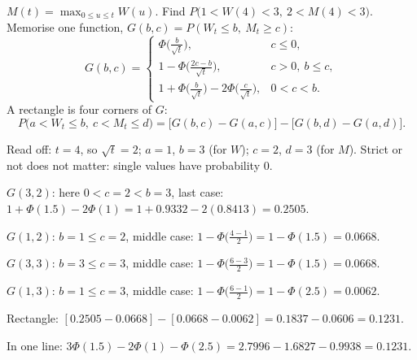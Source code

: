 \begin{problem}[Q5(b)]
$M(t)=\max_{0\le u\le t}W(u)$. Find $P\big(1<W(4)<3,\ 2<M(4)<3\big)$.
\cardsays Memorise one function, $G(b,c)=P(W_t\le b,\ M_t\ge c)$:
\[
G(b,c)=\begin{cases}\Phi\big(\frac{b}{\sqrt t}\big),&c\le0,\\[0.5ex] 1-\Phi\big(\frac{2c-b}{\sqrt t}\big),&c>0,\ b\le c,\\[0.5ex] 1+\Phi\big(\frac b{\sqrt t}\big)-2\Phi\big(\frac c{\sqrt t}\big),&0<c<b.\end{cases}
\]
A rectangle is four corners of $G$:
\[
P\big(a<W_t\le b,\ c<M_t\le d\big)=\big[G(b,c)-G(a,c)\big]-\big[G(b,d)-G(a,d)\big].
\]
\working
\begin{steps}
\item Read off: $t=4$, so $\sqrt t=2$; $a=1$, $b=3$ (for $W$); $c=2$, $d=3$ (for $M$). Strict or not does not matter: single values have probability $0$.
\item $G(3,2)$: here $0<c=2<b=3$, last case: $1+\Phi(1.5)-2\Phi(1)=1+0.9332-2(0.8413)=0.2505$.
\item $G(1,2)$: $b=1\le c=2$, middle case: $1-\Phi\big(\frac{4-1}2\big)=1-\Phi(1.5)=0.0668$.
\item $G(3,3)$: $b=3\le c=3$, middle case: $1-\Phi\big(\frac{6-3}2\big)=1-\Phi(1.5)=0.0668$.
\item $G(1,3)$: $b=1\le c=3$, middle case: $1-\Phi\big(\frac{6-1}2\big)=1-\Phi(2.5)=0.0062$.
\item Rectangle: $[0.2505-0.0668]-[0.0668-0.0062]=0.1837-0.0606=0.1231$.
\item In one line: $3\Phi(1.5)-2\Phi(1)-\Phi(2.5)=2.7996-1.6827-0.9938=0.1231$.
\end{steps}
\end{problem}
